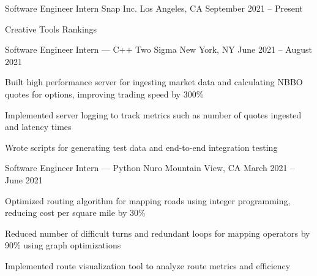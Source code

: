 \documentclass[12pt, letterpaper]{awesome-cv}
\begin{document}
\begin{cventries}
  \cventry
    {Sof\/tware Engineer Intern} %
    {Snap Inc.} %
    {Los Angeles, CA} %
    {September 2021 -- Present} %
    {
      \begin{cvitems} %
        \item {Creative Tools Rankings}
      \end{cvitems}
    }

  \cventry
    {Sof\/tware Engineer Intern — C++} %
    {Two Sigma} %
    {New York, NY} %
    {June 2021 -- August 2021} %
    {
      \begin{cvitems} %
        \item {Built high performance server for ingesting market data and calculating NBBO quotes for options, improving trading speed by 300\%}
        \item {Implemented server logging to track metrics such as number of quotes ingested and latency times}
        \item {Wrote scripts for generating test data and end-to-end integration testing}
      \end{cvitems}
    }

  \cventry
    {Sof\/tware Engineer Intern — Python} %
    {Nuro} %
    {Mountain View, CA} %
    {March 2021 -- June 2021} %
    {
      \begin{cvitems} %
      	\item {Optimized routing algorithm for mapping roads using integer programming, reducing cost per square mile by 30\%}
      	\item {Reduced number of dif\/ficult turns and redundant loops for mapping operators by 90\% using graph optimizations}
      	\item {Implemented route visualization tool to analyze route metrics and ef\/ficiency}
      \end{cvitems}
    }


\end{cventries}
\end{document}

